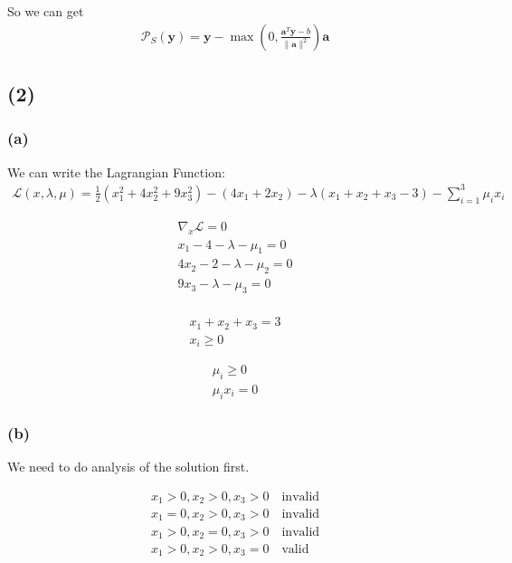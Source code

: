 \documentclass[12pt]{article}
\begin{document}
\noindent
So we can get 
\begin{align*}
    \mathcal{P}_S(\bm{y}) = \bm{y} - \max(0, \frac{\bm{a}^T\bm{y} - b}{\|\bm{a}\|^2})\bm{a}
\end{align*}

\subsection{(2)}
\subsubsection{(a)}
We can write the Lagrangian Function:
\begin{align*}
    \mathcal{L}(x, \lambda, \mu) = \frac{1}{2} (x_1^2 + 4x_2^2 + 9x_3^2) - (4x_1 + 2x_2) - \lambda(x_1 + x_2 + x_3 - 3) - \sum_{i=1}^{3} \mu_i x_i 
\end{align*}

\begin{align*}
    \nabla_{x} \mathcal{L} = 0 \\
    x_1 - 4 - \lambda - \mu_1 = 0 \\
    4x_2 - 2 - \lambda - \mu_2 = 0 \\
    9x_3 - \lambda - \mu_3 = 0 \\
\end{align*}

\begin{align*}
    x_1 + x_2 + x_3 = 3 \\
    x_i \geq 0
\end{align*}

\begin{align*}
    \mu_i \geq 0 \\
    \mu_i x_i = 0
\end{align*}

\subsubsection{(b)}
We need to do analysis of the solution first.

\begin{align*}
    x_1 > 0, x_2 > 0, x_3 > 0 \quad \text{invalid} \\
    x_1 = 0, x_2 > 0, x_3 > 0 \quad \text{invalid} \\
    x_1 > 0, x_2 = 0, x_3 > 0 \quad \text{invalid} \\
    x_1 > 0, x_2 > 0, x_3 = 0 \quad \text{valid} \\
\end{align*}
\end{document}
